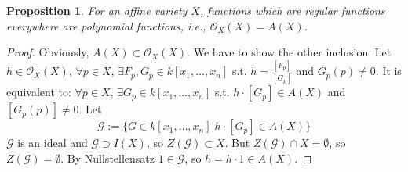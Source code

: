 \documentclass{amsart}
\theoremstyle{plain}
\newtheorem{proposition}{Proposition}
\theoremstyle{definition}
\theoremstyle{remark}
\numberwithin{equation}{section}
\begin{document}
\begin{proposition}\label{10}
	For an affine variety $ X $, functions which are regular functions everywhere are polynomial functions, i.e., $ \mathcal{O}_X(X)=A(X) $.
\end{proposition}
\begin{proof}
	Obviously, $ A(X)\subset \mathcal{O}_X(X) $. We have to show the other inclusion. Let $ h\in \mathcal{O}_X(X) $, $ \forall p\in X $, $ \exists F_p,G_p\in k[x_1,\dots,x_n] $ s.t.
	$ h=\frac{[F_p]}{[G_p]} $ and $ G_p(p)\neq 0 $. It is equivalent to: $ \forall p\in X $, $ \exists G_p\in k[x_1,\dots,x_n] $ s.t. $ h\cdot [G_p] \in A(X)$ and $ [G_p(p)]\neq 0 $. Let
	\begin{equation}
	\mathcal{G}:=\{ G\in k[x_1,\dots,x_n]|h\cdot [G_p]\in A(X) \}
	\end{equation}
	$ \mathcal{G} $ is an ideal and $ \mathcal{G}\supset I(X) $, so $ Z(\mathcal{G})\subset X $. But $ Z(\mathcal{G})\cap X=\emptyset $, so $ Z(\mathcal{G})=\emptyset $. By Nullstellensatz $ 1\in\mathcal{G} $, so $ h=h\cdot 1\in A(X) $.
\end{proof}
\end{document}
